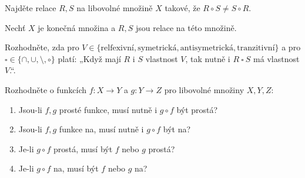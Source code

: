 \documentclass[10pt]{article}
\begin{document}
\begin{problem}
Najděte relace $R,S$ na libovolné množině $X$ takové, že $R \circ S \neq S \circ R$.
\end{problem}

\begin{problem}
Nechť $X$ je konečná množina a $R,S$ jsou relace na této množině. 

\noindent
Rozhodněte, zda pro $V \in \{\text{relfexivní}, \text{symetrická}, \text{antisymetrická},\text{tranzitivní}\}$ a pro $\square \in \{\cap,\cup,\setminus,\circ\}$ platí: „Když mají $R$ i $S$ vlastnost $V$, tak nutně i $R \ \square \ S$ má vlastnost $V$.“.
\end{problem}

\begin{problem}
Rozhodněte o funkcích $f: X \rightarrow Y$ a $g: Y \rightarrow Z$ pro libovolné množiny $X,Y,Z$:
\begin{enumerate}[label=(\alph*)]
    \item Jsou-li $f,g$ prosté funkce, musí nutně i $g \circ f$ být prostá?
    \item Jsou-li $f,g$ funkce na, musí nutně i $g \circ f$ být na?
    \item Je-li $g \circ f$ prostá, musí být $f$ nebo $g$ prostá?
    \item Je-li $g \circ f$ na, musí být $f$ nebo $g$ na?
\end{enumerate}
\end{problem}
\end{document}
